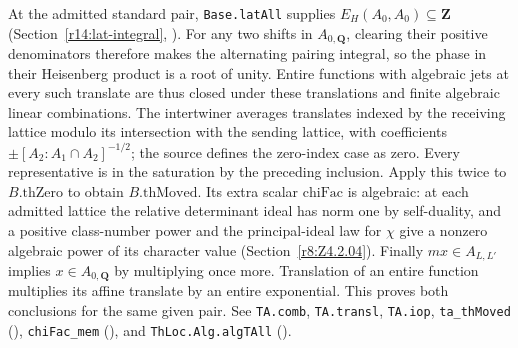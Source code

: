 At the admitted standard pair, \nolinkurl{Base.latAll} supplies
$E_H(A_0,A_0)\subseteq\mathbf Z$ (Section~\ref{r14:lat-integral},
).
For any two shifts in $A_{0,\mathbf Q}$, clearing their positive
denominators therefore makes the alternating pairing integral, so the phase
in their Heisenberg product is a root of unity. Entire functions
with algebraic jets at every such translate are thus closed under
these translations and finite algebraic linear combinations.
The intertwiner averages translates indexed by the receiving
lattice modulo its intersection with the sending lattice, with
coefficients $\pm[ A_2:A_1\cap A_2]^{-1/2}$; the source defines
the zero-index case as zero. Every representative is in the saturation
by the preceding inclusion. Apply this twice to $B.\mathrm{thZero}$
to obtain $B.\mathrm{thMoved}$. Its extra scalar
$\mathrm{chiFac}$ is algebraic: at each admitted lattice the relative
determinant ideal has norm one by self-duality, and a positive
class-number power and the principal-ideal law for $\chi$ give a
nonzero algebraic power of its character value (Section~\ref{r8:Z4.2.04}).
Finally $mx\in A_{L,L'}$
implies $x\in A_{0,\mathbf Q}$ by multiplying once more. Translation
of an entire function multiplies its affine translate by an entire
exponential. This proves both conclusions for the same given pair.
See \nolinkurl{TA.comb}, \nolinkurl{TA.transl}, \nolinkurl{TA.iop},
\nolinkurl{ta_thMoved} (),
\nolinkurl{chiFac_mem} (),
and \nolinkurl{ThLoc.Alg.algTAll} ().

